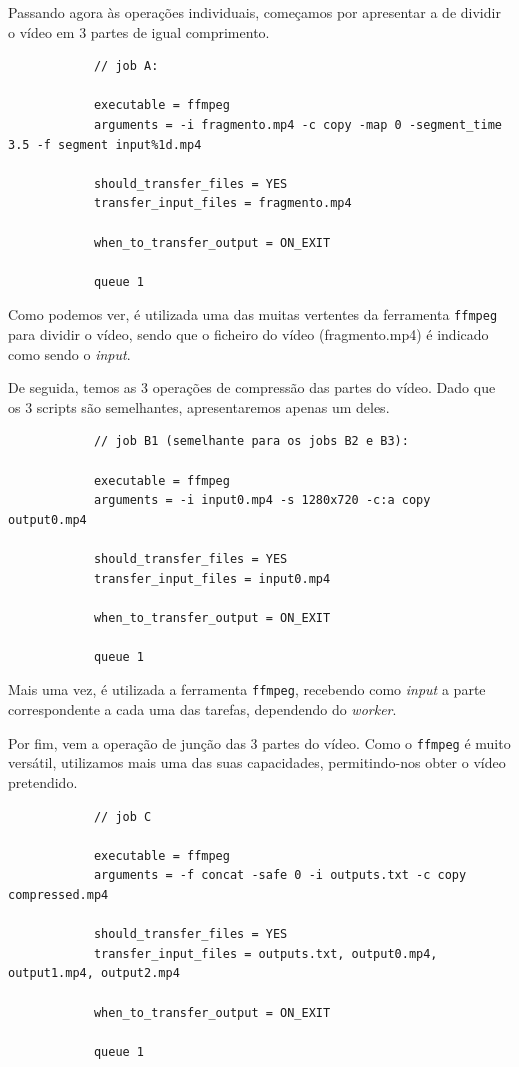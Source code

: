 \documentclass[a4paper]{report}
\begin{document}
	Passando agora às operações individuais, começamos por apresentar a de dividir o vídeo em 3 partes de igual comprimento.
	
	\small{
		\begin{verbatim}
			// job A:

			executable = ffmpeg
			arguments = -i fragmento.mp4 -c copy -map 0 -segment_time 3.5 -f segment input%1d.mp4
	
			should_transfer_files = YES
			transfer_input_files = fragmento.mp4
	
			when_to_transfer_output = ON_EXIT
	
			queue 1
		\end{verbatim}
	}
	\large{
		Como podemos ver, é utilizada uma das muitas vertentes da ferramenta \texttt{ffmpeg} para dividir o vídeo, sendo que o ficheiro do vídeo (fragmento.mp4) é indicado como sendo o \textit{input}.
		
		De seguida, temos as 3 operações de compressão das partes do vídeo. Dado que os 3 scripts são semelhantes, apresentaremos apenas um deles.
	}

	\small{
		\begin{verbatim}
			// job B1 (semelhante para os jobs B2 e B3):

			executable = ffmpeg
			arguments = -i input0.mp4 -s 1280x720 -c:a copy output0.mp4

			should_transfer_files = YES
			transfer_input_files = input0.mp4

			when_to_transfer_output = ON_EXIT

			queue 1
		\end{verbatim}
	}
	
	Mais uma vez, é utilizada a ferramenta \texttt{ffmpeg}, recebendo como \textit{input} a parte correspondente a cada uma das tarefas, dependendo do \textit{worker}.
	
	Por fim, vem a operação de junção das 3 partes do vídeo. Como o \texttt{ffmpeg} é muito versátil, utilizamos mais uma das suas capacidades, permitindo-nos obter o vídeo pretendido.
	
	\small{
		\begin{verbatim}
			// job C

			executable = ffmpeg
			arguments = -f concat -safe 0 -i outputs.txt -c copy compressed.mp4

			should_transfer_files = YES
			transfer_input_files = outputs.txt, output0.mp4, output1.mp4, output2.mp4

			when_to_transfer_output = ON_EXIT

			queue 1
		\end{verbatim}
	}
	
\end{document}
